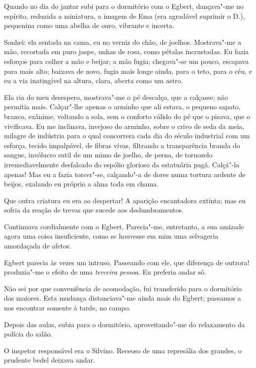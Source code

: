 Quando no dia do jantar subi para o dormitório com o Egbert, dançava"-me no
espírito, reduzida a miniatura, a imagem de Ema (era agradável suprimir
o D.), pequenina como uma abelha de ouro, vibrante e incerta. 

Sonhei: ela sentada na cama, eu no verniz do chão, de joelhos. Mostrava"-me a
mão, recortada em puro jaspe, unhas de rosa, como pétalas incrustadas.
Eu fazia esforços para colher a mão e beijar; a mão fugia; chegava"-se
um pouco, escapava para mais alto; baixava de novo, fugia mais longe
ainda, para o teto, para o céu, e eu a via inatingível na altura,
clara, aberta como um astro. 

Ela ria do meu desespero, mostrava"-me o
pé descalço, que a calçasse; não permitia mais. Calçar"-lhe apenas o
arminho que ali estava, o pequeno sapato, branco, exânime, voltando a
sola, sem o conforto cálido do pé que o pisava, que o vivificava. 
Eu me inclinava, invejoso
do arminho, sobre o crivo de seda da meia, milagre de indústria para o
qual concorrera cada dia do século industrial com um esforço, tecido
impalpável, de fibras vivas, filtrando a transparência branda do
sangue, invólucro sutil de um mimo de joelho, de perna, de tornozelo
irremediavelmente desfalcado do espólio glorioso da estatuária pagã.
Calçá"-la apenas! Mas eu a fazia torcer"-se, calçando"-a de dores
numa tortura ardente de beijos, exalando eu próprio a alma toda em
chama. 

Que outra criatura eu era ao despertar! A aparição encantadora
extinta; mas eu sofria da reação de trevas que sucede aos
deslumbramentos. 

Continuava cordialmente com o Egbert. Parecia"-me,
entretanto, a sua amizade agora uma coisa insuficiente, como se
houvesse em mim uma selvageria amordaçada de afetos. 

Egbert parecia às
vezes um intruso. Passeando com ele, que diferença de outrora!
produzia"-me o efeito de uma \textit{terceira pessoa}. Eu preferia andar só.

Não sei por que conveniência de acomodação, fui transferido para o
dormitório dos maiores. Esta mudança distanciava"-me ainda mais do
Egbert; passamos a nos encontrar somente à tarde, no campo. 

Depois das aulas, subia para o dormitório, aproveitando"-me do relaxamento da
polícia do salão. 

O inspetor responsável era o Silvino. Receoso de uma
represália dos grandes, o prudente bedel deixava andar. 


